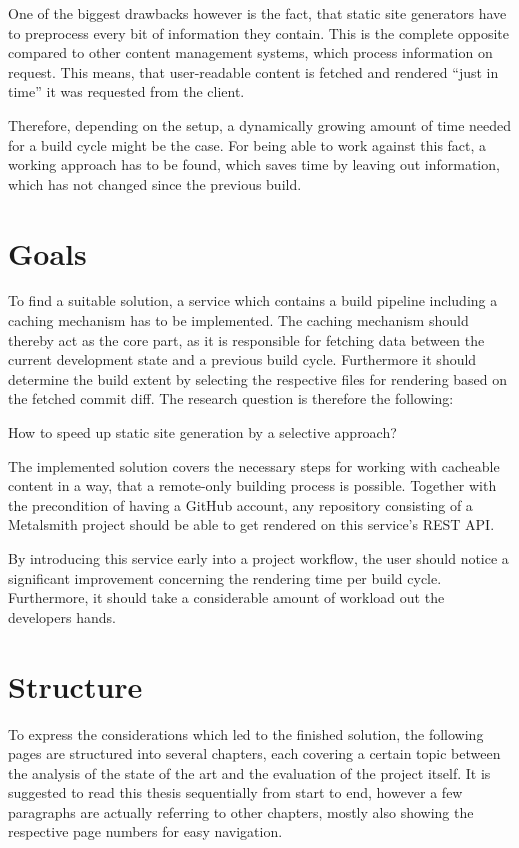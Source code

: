 One of the biggest drawbacks however is the fact, that static site generators have to preprocess every bit of information they contain. This is the complete opposite compared to other content management systems, which process information on request. This means, that user-readable content is fetched and rendered ``just in time'' it was requested from the client.

Therefore, depending on the setup, a dynamically growing amount of time needed for a build cycle might be the case. For being able to work against this fact, a working approach has to be found, which saves time by leaving out information, which has not changed since the previous build.

\section{Goals}
\label{sec:goals}
To find a suitable solution, a service which contains a build pipeline including a caching mechanism has to be implemented. The caching mechanism should thereby act as the core part, as it is responsible for fetching data between the current development state and a previous build cycle. Furthermore it should determine the build extent by selecting the respective files for rendering based on the fetched commit diff. The research question is therefore the following:

\begin{center}
  How to speed up static site generation by a selective approach?
\end{center}
The implemented solution covers the necessary steps for working with cacheable content in a way, that a remote-only building process is possible. Together with the precondition of having a GitHub account, any repository consisting of a Metalsmith project should be able to get rendered on this service's REST API.

By introducing this service early into a project workflow, the user should notice a significant improvement concerning the rendering time per build cycle. Furthermore, it should take a considerable amount of workload out the developers hands.

\section{Structure}
\label{sec:structure}
To express the considerations which led to the finished solution, the following pages are structured into several chapters, each covering a certain topic between the analysis of the state of the art and the evaluation of the project itself. It is suggested to read this thesis sequentially from start to end, however a few paragraphs are actually referring to other chapters, mostly also showing the respective page numbers for easy navigation.

